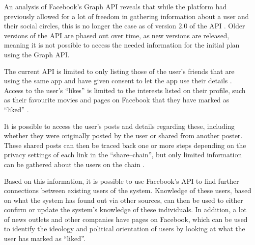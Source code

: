 An analysis of Facebook's Graph \ac{API} \citep{FacebookGraphApiDocumentation}
reveals that while the platform had previously allowed for a lot of freedom in
gathering information about a user and their social circles, this is no longer
the case as of version 2.0 of the API \citep{FacebookChangesInGraphTwoPointOh}.
Older versions of the \ac{API} are phased out over time, as new versions are
released, meaning it is not possible to access the needed information for the
initial plan using the Graph API.\nl

The current \ac{API} is limited to only listing those of the user's friends
that are using the same app and have given consent to let the app use their
details \citep{FacebookChangesInGraphTwoPointOh}. Access to the user's ``likes''
is limited to the interests listed on their profile, such as their favourite
movies and pages on Facebook that they have marked as ``liked''
\citep{FacebookGraphApiUserLikes} \citep{FacebookGraphApiUserEdges}.\nl

It is possible to access the user's posts and details regarding these,
including whether they were originally posted by the user or shared from
another poster. These shared posts can then be traced back one or more steps
depending on the privacy settings of each link in the ``share--chain'', but
only limited information can be gathered about the users on the chain
\citep{FacebookGraphApiUserFeed}.\nl

Based on this information, it is possible to use Facebook's \ac{API} to find
further connections between existing users of the system.
Knowledge of these users, based on what the system has found out via other
sources, can then be used to either confirm or update the system's knowledge of
these individuals.
In addition, a lot of news outlets and other companies have pages on Facebook,
which can be used to identify the ideology and political orientation of
users by looking at what the user has marked as ``liked''.
